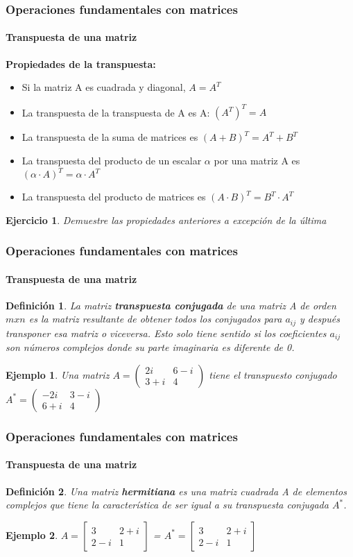 \documentclass[11pt]{beamer}
\newtheorem{defi}{Definición}
\newtheorem{eje}{Ejercicio}
\newtheorem{ejem}{Ejemplo}
\begin{document}
\begin{frame}
\frametitle{Operaciones fundamentales con matrices}
\framesubtitle{Transpuesta de una matriz}
\textbf{Propiedades de la transpuesta: }\\
\begin{itemize}
\item Si la matriz A es cuadrada y diagonal, $A = A^T$
\item La transpuesta de la transpuesta de A es A: $(A^T)^T = A$
\item La transpuesta de la suma de matrices es $(A + B)^T = A^T + B^T$
\item La transpuesta del producto de un escalar $\alpha$ por una matriz A es $(\alpha \cdot A)^T = \alpha \cdot A^T$
\item La transpuesta del producto de matrices es $(A·B)^T = B^T \cdot A^T$
\end{itemize}
\begin{eje}
Demuestre las propiedades anteriores a excepción de la última
\end{eje}
\end{frame}

\begin{frame}
\frametitle{Operaciones fundamentales con matrices}
\framesubtitle{Transpuesta de una matriz}
\begin{defi}
La matriz \textbf{transpuesta conjugada} de una matriz A de orden $mxn$ es la matriz resultante de obtener todos los conjugados para $a_{ij}$ y después transponer esa matriz o viceversa. Esto solo tiene sentido si los coeficientes $a_{ij}$ son números complejos donde su parte imaginaria es diferente de 0.
\end{defi}
\begin{ejem}
Una matriz ${\displaystyle A={\begin{pmatrix}2i&6-i\\3+i&4\end{pmatrix}}}$ tiene el transpuesto conjugado ${\displaystyle A^{*}={\begin{pmatrix}-2i&3-i\\6+i&4\end{pmatrix}}}$
\end{ejem}
\end{frame}

\begin{frame}
\frametitle{Operaciones fundamentales con matrices}
\framesubtitle{Transpuesta de una matriz}
\begin{defi}
Una matriz \textbf{hermitiana} es una matriz cuadrada A de elementos complejos que tiene la característica de ser igual a su transpuesta conjugada $A^*$.
\end{defi}
\begin{ejem}
${\displaystyle A={\begin{bmatrix}3&2+i\\2-i&1\end{bmatrix}}}$ = 
${\displaystyle A^*={\begin{bmatrix}3&2+i\\2-i&1\end{bmatrix}}}$
\end{ejem}
\end{frame}
\end{document}
